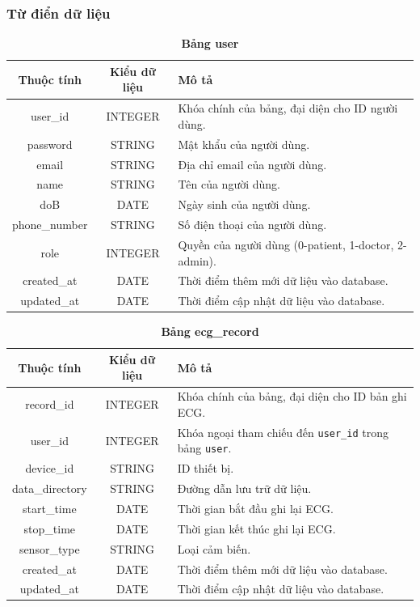 \subsubsection{Từ điển dữ liệu}



\begin{table}[H]
  \caption{\bfseries \fontsize{12pt}{0pt}\selectfont Bảng user}
  \centering
  \begin{tabularx}{0.9\textwidth}{|c|c|X|}
    \hline
    \textbf{Thuộc tính} & \textbf{Kiểu dữ liệu} & \textbf{Mô tả} \\
    \hline
    user\_id & INTEGER & Khóa chính của bảng, đại diện cho ID người dùng. \\
    \hline
    password & STRING & Mật khẩu của người dùng. \\
    \hline
    email & STRING & Địa chỉ email của người dùng. \\
    \hline
    name & STRING & Tên của người dùng. \\
    \hline
    doB & DATE & Ngày sinh của người dùng. \\
    \hline
    phone\_number & STRING & Số điện thoại của người dùng. \\
    \hline
    role & INTEGER & Quyền của người dùng (0-patient, 1-doctor, 2-admin). \\
    \hline
    created\_at & DATE & Thời điểm thêm mới dữ liệu vào database. \\
    \hline
    updated\_at & DATE & Thời điểm cập nhật dữ liệu vào database. \\
    \hline
    
  \end{tabularx}
\end{table}

\begin{table}[H]
  \caption{\bfseries \fontsize{12pt}{0pt}\selectfont Bảng ecg\_record}
  \centering
  \begin{tabularx}{0.9\textwidth}{|c|c|X|}
    \hline
    \textbf{Thuộc tính} & \textbf{Kiểu dữ liệu} & \textbf{Mô tả} \\
    \hline
    record\_id & INTEGER & Khóa chính của bảng, đại diện cho ID bản ghi ECG. \\
    \hline
    user\_id & INTEGER & Khóa ngoại tham chiếu đến \texttt{user\_id} trong bảng \texttt{user}. \\
    \hline
    device\_id & STRING & ID thiết bị. \\
    \hline
    data\_directory & STRING & Đường dẫn lưu trữ dữ liệu. \\
    \hline
    start\_time & DATE & Thời gian bắt đầu ghi lại ECG. \\
    \hline
    stop\_time & DATE & Thời gian kết thúc ghi lại ECG. \\
    \hline
    sensor\_type & STRING & Loại cảm biến. \\
    \hline
    created\_at & DATE & Thời điểm thêm mới dữ liệu vào database. \\
    \hline
    updated\_at & DATE & Thời điểm cập nhật dữ liệu vào database. \\
    \hline
  \end{tabularx}
\end{table}

